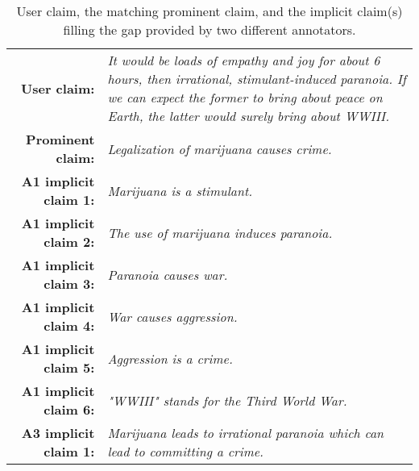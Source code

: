 \begin{table}[t!]
{\small
\begin{tabular}{@{\ }r@{\ \  }p{}}
\toprule
\textbf{User claim:} & \emph{It would be loads of empathy and joy for about 6
hours, then irrational, stimulant-induced paranoia. If we can expect the former
to bring about peace on Earth, the latter would surely bring about WWIII.}\\
\textbf{Prominent claim:} & \emph{Legalization of marijuana causes crime.}\\
\midrule
\textbf{A1 implicit claim 1:} & \emph{Marijuana is a stimulant.}\\
\textbf{A1 implicit claim 2:} & \emph{The use of marijuana induces paranoia.}\\
\textbf{A1 implicit claim 3:} & \emph{Paranoia causes war.}\\
\textbf{A1 implicit claim 4:} & \emph{War causes aggression.}\\
\textbf{A1 implicit claim 5:} & \emph{Aggression is a crime.}\\
\textbf{A1 implicit claim 6:} & \emph{"WWIII" stands for the Third World War.}\\
\midrule
\textbf{A3 implicit claim 1:} & \emph{Marijuana leads to irrational paranoia which can lead to committing a crime.} \\
\bottomrule
\end{tabular}}
\caption{User claim, the matching prominent claim, and the implicit claim(s)
filling the gap provided by two different annotators.}
\label{tab:extreme_premisenumber}
\end{table}

